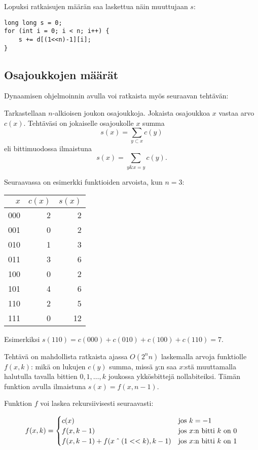 Lopuksi ratkaisujen määrän saa laskettua näin
muuttujaan $s$:

\begin{lstlisting}
long long s = 0;
for (int i = 0; i < n; i++) {
    s += d[(1<<n)-1][i];
}
\end{lstlisting}

\subsection{Osajoukkojen määrät}

Dynaamisen ohjelmoinnin avulla voi ratkaista
myös seuraavan tehtävän:

\begin{task}
Tarkastellaan $n$-alkioisen joukon osajoukkoja.
Jokaista osajoukkoa $x$ vastaa arvo $c(x)$.
Tehtäväsi on jokaiselle osajoukolle $x$
summa
\[s(x)=\sum_{y \subset x} c(y) \]
eli bittimuodossa ilmaistuna
\[s(x)=\sum_{y \& x = y} c(y). \]
\end{task}

\noindent
Seuraavassa on esimerkki funktioiden arvoista,
kun $n=3$:

\begin{center}
\begin{tabular}{rrr}
$x$ & $c(x)$ & $s(x)$ \\
\hline
000 & 2 & 2 \\
001 & 0 & 2 \\
010 & 1 & 3 \\
011 & 3 & 6 \\
100 & 0 & 2 \\
101 & 4 & 6 \\
110 & 2 & 5 \\
111 & 0 & 12 \\
\end{tabular}
\end{center}

Esimerkiksi $s(110)=c(000)+c(010)+c(100)+c(110)=7$. 

Tehtävä on mahdollista ratkaista ajassa $O(2^n n)$
laskemalla arvoja funktiolle $f(x,k)$:
mikä on lukujen $c(y)$ summa, missä $y$:n saa $x$:stä
muuttamalla halutulla tavalla bittien $0,1,\ldots,k$
joukossa ykkösbittejä nollabiteiksi.
Tämän funktion avulla ilmaistuna $s(x)=f(x,n-1)$.

Funktion $f$ voi laskea rekursiivisesti seuraavasti:

\begin{equation*}
    f(x,k) = \begin{cases}
               c(x)          & \textrm{jos $k=-1$}\\
               f(x,k-1)          & \textrm{jos $x$:n bitti $k$ on 0}\\
               f(x,k-1)+f(x \XOR (1 < < k),k-1)    & \textrm{jos $x$:n bitti $k$ on 1}\\
           \end{cases}
\end{equation*}

